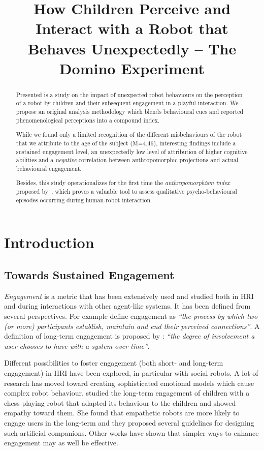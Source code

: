 \documentclass{sig-alternate}
\title{\LARGE \bf
How Children Perceive and Interact with a Robot that Behaves Unexpectedly -- The Domino Experiment
}
\begin{document}
\maketitle
\begin{abstract}

Presented is a study on the impact of unexpected robot behaviours on the
perception of a robot by children and their subsequent engagement in a playful interaction.
We propose an original analysis methodology which blends behavioural cues and
reported phenomenological perceptions into a compound index.

While we found only a limited recognition of the different misbehaviours of the
robot that we attribute to the age of the subject (M=4.46), interesting findings
include a sustained engagement level, an unexpectedly low level of attribution
of higher cognitive abilities and a \emph{negative} correlation between
anthropomorphic projections and actual behavioural engagement.

Besides, this study operationalizes for the first time the
\emph{anthropomorphism index} proposed by~\cite{fink2014dynamics}, which proves a
valuable tool to assess qualitative psycho-behavioural episodes occurring during
human-robot interaction.

\end{abstract}
\section{Introduction}
\subsection{Towards Sustained Engagement}

\emph{Engagement} is a metric that has been extensively used and studied both
in HRI and during interactions with other agent-like systems. It has been
defined from several perspectives. For example \cite{sidner_where_2004} define
engagement as \textit{``the process by which two (or more) participants
establish, maintain and end their perceived connections''}. A definition of
long-term engagement is proposed by \cite{bickmore_maintaining_2010}:
\textit{``the degree of involvement a user chooses to have with a system over
time''}.

Different possibilities to foster engagement (both short- and long-term
engagement) in HRI have been explored, in particular with social robots. A lot
of research has moved toward creating sophisticated emotional models which cause
complex robot behaviour. \cite{leite_long-term_2013} studied the long-term
engagement of children with a chess playing robot that adapted its behaviour to
the children and showed empathy toward them. She found that empathetic robots
are more likely to engage users in the long-term and they proposed several
guidelines for designing such artificial companions. Other works
\cite{bickmore_maintaining_2010,short_no_2010} have shown that simpler ways to
enhance engagement may as well be effective.
\end{document}
